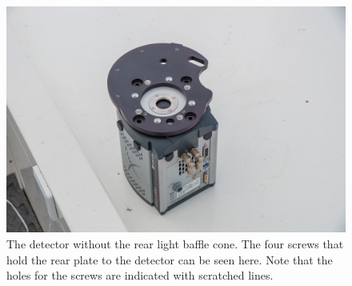 \begin{figure}
\begin{center}
\includegraphics[width=0.8\linewidth]{figures/huitzi-without-rear-cone.jpg}
\end{center}
\caption{The detector without the rear light baffle cone. The four screws that hold the rear plate to the detector can be seen here. Note that the holes for the screws are indicated with scratched lines.}
\label{figure:huitzi-without-rear-cone}
\end{figure}

